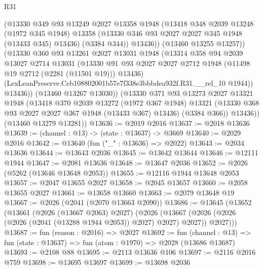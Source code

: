 \begin{lexlean}{R31}
\begin{coremodule}
                (@13330
                  @349
                  @93
                  @13249
                  @2027
                  @13358
                  @1948
                  (@13418
                    @348
                    @2039
                    @13248
                    (@1972 @345 @1948)
                    @13358
                    (@13330 @346 @93 @2027 @2027 @345 @1948 (@13433 @345) @13436)
                    (@3384 @344))
                  @13436))
              (@13460 @13255 @13257))
            (@13330
              @360
              @93
              @13261
              @2027
              @13031
              @1948
              (@13314
                @358
                @94
                @2039
                @13027
                @2714
                @13031
                (@13330
                  @91
                  @93
                  @2027
                  @2027
                  @2712
                  @1948
                  (@11498 @19 @2712 (@2281 (@11501 @19)))
                  @13436)
                (LexLeanPreserve.Ceb108802001b57e7f338e3bbbdea932f.R31.__rel_10 @1944))
              @13436))
          (@13460 @13267 @13030))
        (@13330
          @371
          @93
          @13273
          @2027
          @13321
          @1948
          (@13418
            @370
            @2039
            @13272
            (@1972 @367 @1948)
            @13321
            (@13330 @368 @93 @2027 @2027 @367 @1948 (@13433 @367) @13436)
            (@3384 @366))
          @13436))
      (@13460 @13279 @13281))
@13636 := @2019 @2016
@13637 := @2018 @13636
@13639 := (channel : @13) -> (state : @13637) -> @3669
@13640 := @2029 @2016
@13642 := @13640 (fun ("_" : @13636) => @2022)
@13643 := @2034 @13636
@13644 := @13643 @2036
@13645 := @13642 @13644
@13646 := @12111 @1944
@13647 := @2081 @13636
@13648 := @13647 @2036
@13652 := @2026 (@5262 (@13646 @13648 @2053))
@13655 := @12116 @1944 @13648 @2053
@13657 := @2047 @13655 @2027
@13658 := @2045 @13657
@13660 := @2058 @13655 @2027
@13661 := @13658 @13660
@13663 := @2079 @13648 @19
@13667 := @2026 (@2041 (@2070 @13663 @2090))
@13686 := @13645
    (@13652
      (@13661
        (@2026 (@13667 @2063) @2027)
        (@2026
          (@13667 (@2026 (@2026 (@2026 (@2041 (@13288 @1944 @2053)) @2027) @2027) @2027))
          @2027)))
@13687 := fun (reason : @2016) => @2027
@13692 := fun (channel : @13) => fun (state : @13637) => fun (atom : @1970) => @2028 (@13686 @13687)
@13693 := @2108 @88
@13695 := @2113 @13636 @106
@13697 := @2116 @2016 @759
@13698 := @13695 @13697
@13699 := @13698 @2036

\end{coremodule}
\end{lexlean}
